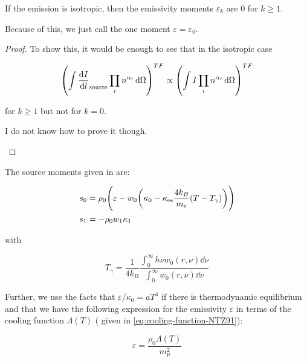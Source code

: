 \documentclass[main.tex]{subfiles}
\begin{document}
\begin{claim}
    If the emission is isotropic, then the emissivity moments \(\varepsilon_k\) are 0 for \(k \geq 1\).
\end{claim}

Because of this, we just call the one moment \(\varepsilon = \varepsilon_0\).

\begin{proof}
    To show this, it would be enough to see that in the isotropic case

    \begin{equation}
        \qty(\int \dv{I}{l}_{\text{source}} \prod_i n^{\alpha_i} \dd{\Omega})^{TF}
        \propto \qty(\int I \prod_i n^{\alpha_i} \dd{\Omega})^{TF}
    \end{equation}

    for \(k \geq 1\) but not for \(k = 0\).

    \begin{greenbox}
      I do not know how to prove it though.
    \end{greenbox}
\end{proof}

The source moments given in \cite[eq. 6]{NobiliTurollaZampieri:1991dec} are:

\begin{subequations}
\begin{align}
  s_0 &= \rho_0 \qty(\varepsilon - w_0 \qty(\kappa_0 - \kappa_{\text{es}} \frac{4 k_B}{m_e} (T - T_\gamma)))  \\
  s_1 &= - \rho_0 w_1 \kappa_1
\end{align}
\end{subequations}

with

\begin{equation}
    T_\gamma = \frac{1}{4 k_B} \frac{\displaystyle \int_0^\infty h \nu w_0 (r, \nu) \dd{\nu}}{\displaystyle \int_0^\infty w_0 (r, \nu) \dd{\nu}}
\end{equation}
%

Further, we use the facts that \(\varepsilon / \kappa_0 = a T^4\) if there is thermodynamic equilibrium and that we have the following expression for the emissivity \(\varepsilon\) in terms of the cooling function \(\Lambda (T)\) ( given in \eqref{eq:cooling-function-NTZ91}):

\begin{equation}
    \varepsilon = \frac{\rho_0 \Lambda (T)}{m_p^2}
\end{equation}
\end{document}

